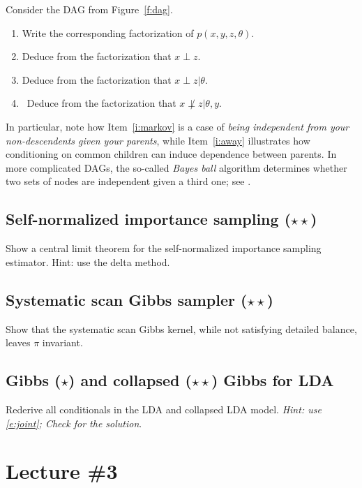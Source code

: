 \documentclass{article}
\begin{document}
Consider the DAG from Figure~\ref{f:dag}.
\begin{enumerate}
\item Write the corresponding factorization of $p(x,y,z,\theta)$.
\item Deduce from the factorization that $x\perp z$.
\item\label{i:markov} Deduce from the factorization that $x\perp z\vert\theta$.
\item\label{i:away} Deduce from the factorization that $x\not\perp z\vert \theta, y$.
\end{enumerate}
In particular, note how Item~\ref{i:markov} is a case of \emph{being independent from your non-descendents given your parents}, while Item~\ref{i:away} illustrates how conditioning on common children can induce dependence between parents. In more complicated DAGs, the so-called \emph{Bayes ball} algorithm determines whether two sets of nodes are independent given a third one; see \cite[Section 10.5]{Mur12}.

\subsection{Self-normalized importance sampling ($\star\star$)}
Show a central limit theorem for the self-normalized importance sampling estimator. Hint: use the delta method.

\subsection{Systematic scan Gibbs sampler ($\star\star$)}
Show that the systematic scan Gibbs kernel, while not satisfying detailed balance, leaves $\pi$ invariant.

\subsection{Gibbs ($\star$) and collapsed ($\star\star$) Gibbs for LDA}
Rederive all conditionals in the LDA and collapsed LDA model.  \emph{Hint: use \eqref{e:joint}; Check \citep[Section 27.3.4]{Mur12} for the solution}.

\section{Lecture \#3}
\end{document}

